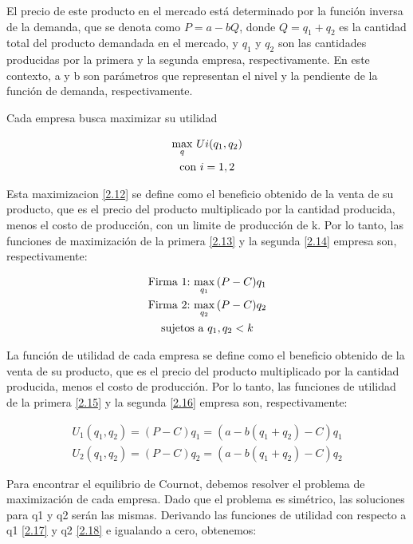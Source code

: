 El precio de este producto en el mercado está determinado por la función inversa de la demanda, que se denota como $P = a - bQ$, donde $Q = q_1 + q_2$ es la cantidad total del producto demandada en el mercado, y $q_1$ y $q_2$ son las cantidades producidas por la primera y la segunda empresa, respectivamente. En este contexto, a y b son parámetros que representan el nivel y la pendiente de la función de demanda, respectivamente.
\vspace{2.5mm}

Cada empresa busca maximizar su utilidad


\begin{gather}
    \max_{q} \, {Ui(q_1,q_2)}\label{2.12}  \\
    \textrm{con} \ i=1,2 \notag
\end{gather}

Esta maximizacion \ref{2.12}  se define como el beneficio obtenido de la venta de su producto, que es el precio del producto multiplicado por la cantidad producida, menos el costo de producción, con un limite de producción de k. Por lo tanto, las funciones de maximización de la primera \ref{2.13} y la segunda \ref{2.14} empresa son, respectivamente:


\begin{gather}
    \text {Firma 1:} \, \max_{q_1} \, (P-C)q_1\label{2.13} \\
    \text {Firma 2:} \, \max_{q_2} \, (P-C)q_2\label{2.14} \\
    \textrm{sujetos a} \ q_1,q_2 <k \notag
\end{gather}

La función de utilidad de cada empresa se define como el beneficio obtenido de la venta de su producto, que es el precio del producto multiplicado por la cantidad producida, menos el costo de producción. Por lo tanto, las funciones de utilidad de la primera \ref{2.15} y la segunda \ref{2.16} empresa son, respectivamente:

\begin{gather}
    U_1(q_1,q_2) =  (P-C)q_1 = (a-b(q_1+q_2)-C)q_1\label{2.15} \\
    U_2(q_1, q_2) = (P-C)q_2 = (a-b(q_1+q_2)-C)q_2\label{2.16} 
\end{gather}


Para encontrar el equilibrio de Cournot, debemos resolver el problema de maximización de cada empresa. Dado que el problema es simétrico, las soluciones para q1 y q2 serán las mismas. Derivando las funciones de utilidad con respecto a q1 \ref{2.17} y q2 \ref{2.18} e igualando a cero, obtenemos:


